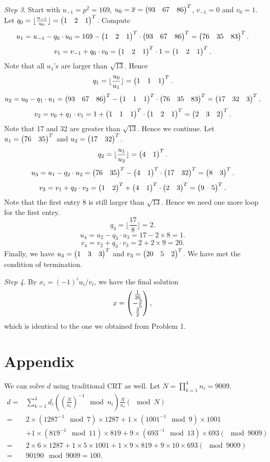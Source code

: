 \documentclass[12pt]{article}
\theoremstyle{plain}
\begin{document}
\emph{Step 3}. Start with $u_{-1} = p^2 = 169$, $u_0=\overline{x} = \begin{pmatrix}93 & 67 & 86\end{pmatrix}^T$, $v_{-1} = 0$ and $v_0=1$. Let $q_0 = \lfloor \frac{u_{-1}}{u_0} \rfloor = \begin{pmatrix}1 & 2 & 1\end{pmatrix}^T$. Compute
$$u_1 = u_{-1} - q_0\cdot u_0 = 169 - \begin{pmatrix}1 & 2 & 1\end{pmatrix}^T \cdot \begin{pmatrix}93 & 67 & 86\end{pmatrix}^T = \begin{pmatrix}76 & 35 & 83\end{pmatrix}^T.$$
$$v_1 = v_{-1} + q_0\cdot v_0 = \begin{pmatrix}1 & 2 & 1\end{pmatrix}^T \cdot 1 = \begin{pmatrix}1 & 2 & 1\end{pmatrix}^T.$$
Note that all $u_1$'s are larger than $\sqrt{13}$. Hence
$$q_1 = \lfloor \frac{u_0}{u_1} \rfloor = \begin{pmatrix}1 & 1 & 1\end{pmatrix}^T.$$
$$u_2 = u_0 - q_1\cdot u_1 = \begin{pmatrix}93 & 67 & 86\end{pmatrix}^T - \begin{pmatrix}1 & 1 & 1\end{pmatrix}^T \cdot \begin{pmatrix}76 & 35 & 83\end{pmatrix}^T = \begin{pmatrix}17 & 32 & 3\end{pmatrix}^T.$$
$$v_2 = v_0 + q_1\cdot v_1 = 1 + \begin{pmatrix}1 & 1 & 1\end{pmatrix}^T \cdot \begin{pmatrix}1 & 2 & 1\end{pmatrix}^T = \begin{pmatrix}2&3&2\end{pmatrix}^T.$$
Note that 17 and 32 are greater than $\sqrt{13}$. Hence we continue. Let $u_1 = \begin{pmatrix}76 & 35\end{pmatrix}^T$ and $u_2 = \begin{pmatrix}17 & 32\end{pmatrix}^T$.
$$q_2 = \lfloor \frac{u_1}{u_2} \rfloor = \begin{pmatrix}4 & 1\end{pmatrix}^T.$$
$$u_3 = u_1 - q_2\cdot u_2 = \begin{pmatrix}76 & 35\end{pmatrix}^T - \begin{pmatrix}4 & 1\end{pmatrix}^T \cdot \begin{pmatrix}17 & 32\end{pmatrix}^T = \begin{pmatrix}8 & 3\end{pmatrix}^T.$$
$$v_3 = v_1 + q_2\cdot v_2 = \begin{pmatrix}1 & 2\end{pmatrix}^T + \begin{pmatrix}4 & 1\end{pmatrix}^T \cdot \begin{pmatrix}2&3\end{pmatrix}^T = \begin{pmatrix}9 & 5\end{pmatrix}^T.$$
Note that the first entry 8 is still larger than $\sqrt{13}$. Hence we need one more loop for the first entry.
$$q_3 = \lfloor \frac{17}{8} \rfloor = 2.$$
$$u_4 = u_2 - q_3\cdot u_3 = 17 - 2\times 8 = 1.$$
$$v_4 = v_2 + q_3\cdot v_3 = 2 + 2\times 9 = 20.$$
Finally, we have $u_3=\begin{pmatrix}1 & 3 & 3\end{pmatrix}^T$ and $v_3 = \begin{pmatrix}20 & 5 & 2\end{pmatrix}^T$. 
We have met the condition of termination.

\emph{Step 4}. By $x_i = (-1)^i u_i/v_i$, we have the final solution
$$x = \begin{pmatrix}\frac{1}{20} \\ -\frac{3}{5} \\ \frac{3}{2}\end{pmatrix},$$
which is identical to the one we obtained from Problem 1.

\section{Appendix}
We can solve $d$ using traditional CRT as well. 
Let $N = \prod_{k=1}^4 n_i = 9009$.
$$\begin{aligned}
d =& \sum_{k=1}^4 d_i \left(\left(\frac{N}{n_i}\right)^{-1} \mod n_i \right) \frac{N}{n_i}  (\mod N)\\
=& 2\times(1287^{-1} \mod 7)\times 1287 + 1\times(1001^{-1} \mod 9)\times 1001 \\
&+ 1\times(819^{-1} \mod 11)\times 819 + 9\times(693^{-1} \mod 13)\times 693 (\mod 9009)\\
=& 2\times 6\times 1287 + 1\times 5\times 1001 + 1\times 9\times 819 + 9\times 10\times 693 (\mod 9009)\\
=& 90190 \mod 9009 = 100.
\end{aligned}$$
\end{document}
